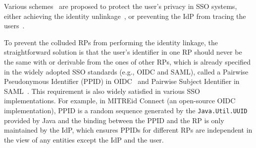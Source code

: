 Various schemes~\cite{SAMLIdentifier,OpenIDConnect,persona,SPRESSO} are proposed to protect the user's privacy in SSO systems, either achieving the identity unlinkage~\cite{SAMLIdentifier,OpenIDConnect}, or preventing the IdP from tracing the users~\cite{persona,SPRESSO}.

To prevent the colluded RPs from performing the identity linkage, the straightforward solution is that the user's identifier in one RP should never be the same with or derivable from the ones of other RPs, which is already specified in the widely adopted SSO standards (e.g., OIDC and SAML), called a Pairwise Pseudonymous Identifier (PPID) in OIDC~\cite{OpenIDConnect} and Pairwise Subject Identifier in SAML~\cite{SAMLIdentifier}. This requirement is also widely satisfied in various SSO implementations. For example, in MITREid Connect (an open-source OIDC implementation), PPID is a random sequence generated by the \verb+Java.Util.UUID+ provided by Java and the binding between the PPID and the RP is only maintained by the IdP, which ensures PPIDs for different RPs are independent in the view of any entities except the IdP and the user.



